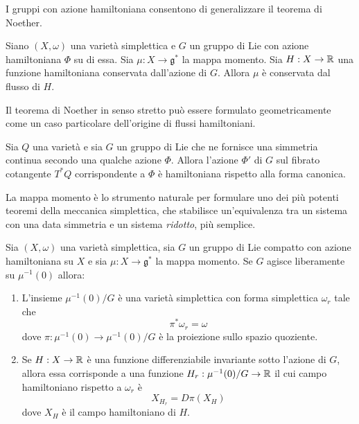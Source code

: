 I gruppi con azione hamiltoniana consentono di generalizzare il teorema di Noether.

\begin{theorem}
  Siano $(X,\omega)$ una varietà simplettica e $G$ un gruppo di Lie con azione hamiltoniana $\Phi$ su di essa. Sia $\mu: X\to \mathfrak{g}^*$ la mappa momento. Sia $H: X\to \mathbb{R}$ una funzione hamiltoniana conservata dall'azione di $G$. Allora $\mu$ è conservata dal flusso di $H$.
\end{theorem}

Il teorema di Noether in senso stretto può essere formulato geometricamente come un caso particolare dell'origine di flussi hamiltoniani.
\begin{theorem}
  Sia $Q$ una varietà e sia $G$ un gruppo di Lie che ne fornisce una simmetria continua secondo una qualche azione $\Phi$. Allora l'azione $\Phi'$ di $G$ sul fibrato cotangente $T^*Q$ corrispondente a $\Phi$ è hamiltoniana rispetto alla forma canonica.
\end{theorem}

La mappa momento è lo strumento naturale per formulare uno dei più potenti teoremi della meccanica simplettica, che stabilisce un'equivalenza tra un sistema con una data simmetria e un sistema \emph{ridotto}, più semplice.
\begin{theorem}
  Sia $(X,\omega)$ una varietà simplettica, sia $G$ un gruppo di Lie compatto con azione hamiltoniana su $X$ e sia $\mu:  X \to \mathfrak{g}^*$ la mappa momento. Se $G$ agisce liberamente su $\mu^{-1}(0)$ allora:
  \begin{enumerate}
    \item L'insieme $\mu^{-1}(0)/G$ è una varietà simplettica con forma simplettica $\omega_r$ tale che \begin{equation*}
    \pi^* \omega_r = \omega
    \end{equation*} 
    dove $\pi:\mu^{-1}(0) \to \mu^{-1}(0)/G$ è la proiezione sullo spazio quoziente.
    \item Se $H:X\to \mathbb{R}$ è una funzione differenziabile invariante sotto l'azione di $G$, allora essa corrisponde a una funzione $H_r:\mu^{-1}(0)/G \to \mathbb{R}$ il cui campo hamiltoniano rispetto a $\omega_r$ è \begin{equation*}
    X_{H_r} = D \pi(X_H)
    \end{equation*}
    dove $X_H$ è il campo hamiltoniano di $H$.
  \end{enumerate}
\end{theorem}